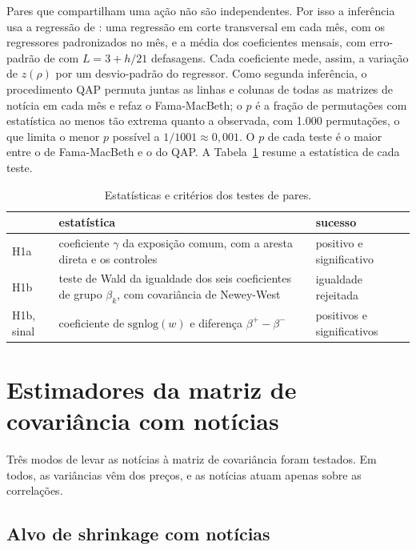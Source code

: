 Pares que compartilham uma ação não são independentes. Por isso a inferência usa a regressão de
\citet{fama1973}: uma regressão em corte transversal em cada mês, com os regressores padronizados no
mês, e a média dos coeficientes mensais, com erro-padrão de \citet{newey1987} com $L=3+h/21$ defasagens.
Cada coeficiente mede, assim, a variação de $z(\rho)$ por um desvio-padrão do regressor. Como segunda
inferência, o procedimento QAP \citep{krackhardt1988} permuta juntas as linhas e colunas de todas as
matrizes de notícia em cada mês e refaz o Fama-MacBeth; o $p$ é a fração de permutações com estatística ao
menos tão extrema quanto a observada, com 1.000 permutações, o que limita o menor $p$ possível a
$1/1001\approx0{,}001$. O $p$ de cada teste é o maior entre o de Fama-MacBeth e o do QAP. A
Tabela~\ref{tab:testes-diadicos} resume a estatística de cada teste.

\begin{table}[htbp]
\centering
\small
\caption{Estatísticas e critérios dos testes de pares.}
\label{tab:testes-diadicos}
\begin{tabularx}{\textwidth}{>{\raggedright\arraybackslash}p{1.6cm}>{\raggedright\arraybackslash}X>{\raggedright\arraybackslash}p{4.2cm}}
\toprule
& estatística & sucesso \\
\midrule
H1a & coeficiente $\gamma$ da exposição comum, com a aresta direta e os controles & positivo e significativo \\
H1b & teste de Wald da igualdade dos seis coeficientes de grupo $\beta_k$, com covariância de Newey-West & igualdade rejeitada \\
H1b, sinal & coeficiente de $\mathrm{sgnlog}(w)$ e diferença $\beta^+-\beta^-$ & positivos e significativos \\
\bottomrule
\end{tabularx}
\end{table}

\section{Estimadores da matriz de covariância com notícias}
\label{sec:estimadores}

Três modos de levar as notícias à matriz de covariância foram testados. Em todos, as variâncias vêm dos
preços, e as notícias atuam apenas sobre as correlações.

\subsection{Alvo de shrinkage com notícias}

